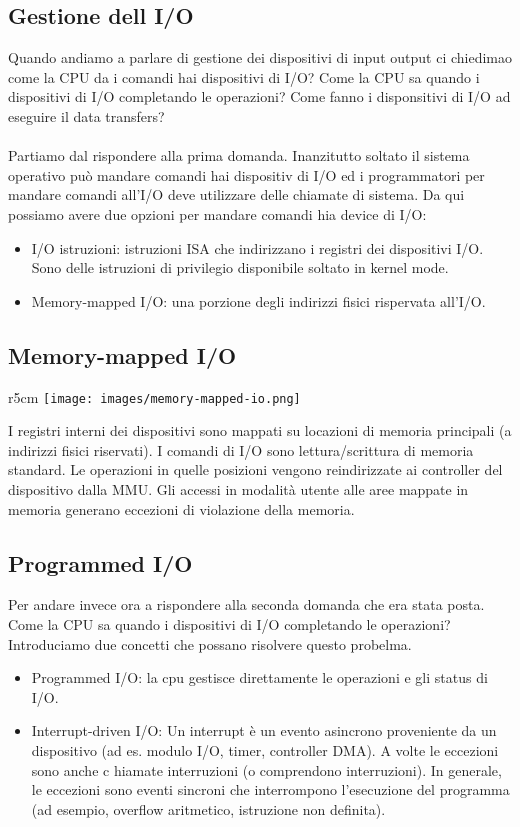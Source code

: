 \subsection{Gestione dell I/O}
Quando andiamo a parlare di gestione dei dispositivi di input output ci chiedimao come la CPU da i comandi 
hai dispositivi di I/O? Come la CPU sa quando i dispositivi di I/O completando le operazioni? Come fanno i 
disponsitivi di I/O ad eseguire il data transfers?\\\\
Partiamo dal rispondere alla prima domanda. Inanzitutto soltato il sistema operativo può mandare comandi hai dispositiv
di I/O ed i programmatori per mandare comandi all'I/O deve utilizzare delle chiamate di sistema. Da qui possiamo avere
due opzioni per mandare comandi hia device di I/O:
\begin{itemize}
    \item I/O istruzioni: istruzioni ISA che indirizzano i registri dei dispositivi I/O. Sono delle istruzioni di privilegio disponibile soltato in kernel mode.
    \item Memory-mapped I/O: una porzione degli indirizzi fisici rispervata all'I/O.
\end{itemize}

\subsection{Memory-mapped I/O}
\begin{wrapfigure}{r}{5cm}
    \vspace{-3cm0pt}
    \centering
    \texttt{[image: images/memory-mapped-io.png]}
\end{wrapfigure}
I registri interni dei dispositivi sono mappati su locazioni di memoria principali (a indirizzi fisici riservati). 
I comandi di I/O sono lettura/scrittura di memoria standard. Le operazioni in quelle posizioni vengono reindirizzate ai controller del dispositivo dalla MMU. 
Gli accessi in modalità utente alle aree mappate in memoria generano eccezioni di violazione della memoria.

\subsection{Programmed I/O}
Per andare invece ora a rispondere alla seconda domanda che era stata posta. Come la CPU sa quando i dispositivi di I/O completando le operazioni?
Introduciamo due concetti che possano risolvere questo probelma.
\begin{itemize}
    \item Programmed I/O: la cpu gestisce direttamente le operazioni e gli status di I/O.
    \item Interrupt-driven I/O: Un interrupt è un evento asincrono proveniente da un dispositivo (ad es. modulo I/O, timer, controller DMA). A volte le eccezioni sono anche c
    hiamate interruzioni (o comprendono interruzioni). In generale, le eccezioni sono eventi sincroni che interrompono l'esecuzione del programma (ad esempio, overflow aritmetico, istruzione non definita).
\end{itemize}

